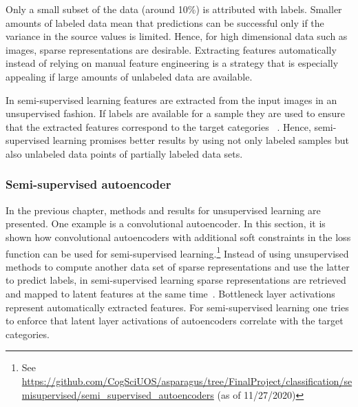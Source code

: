 Only a small subset of the data (around 10\%) is attributed with labels. Smaller amounts of labeled data mean that predictions can be successful only if the variance in the source values is limited. Hence, for high dimensional data such as images, sparse representations are desirable. Extracting features automatically instead of relying on manual feature engineering is a strategy that is especially appealing if large amounts of unlabeled data are available.

In semi-supervised learning features are extracted from the input images in an unsupervised fashion. If labels are available for a sample they are used to ensure that the extracted features correspond to the target categories  ~\citep{keng2017semi}. Hence, semi-supervised learning promises better results by using not only labeled samples but also unlabeled data points of partially labeled data sets.


\subsubsection{Semi-supervised autoencoder}
\label{subsec:VariationalAutoencoder}

In the previous chapter, methods and results for unsupervised learning are presented. One example is a convolutional autoencoder. In this section, it is shown how convolutional autoencoders with additional soft constraints in the loss function can be used for semi-supervised learning.\footnote{See \url{https://github.com/CogSciUOS/asparagus/tree/FinalProject/classification/semisupervised/semi_supervised_autoencoders} (as of 11/27/2020)} Instead of using unsupervised methods to compute another data set of sparse representations and use the latter to predict labels, in semi-supervised learning sparse representations are retrieved and mapped to latent features at the same time~\citep{keng2017semi}. Bottleneck layer activations represent automatically extracted features. For semi-supervised learning one tries to enforce that latent layer activations of autoencoders correlate with the target categories.

